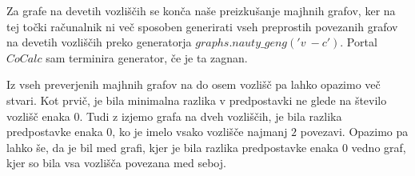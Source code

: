 \documentclass[10pt, a4paper]{article}
\begin{document}
Za grafe na devetih vozliščih se konča naše preizkušanje majhnih grafov, ker na tej točki računalnik ni več sposoben generirati vseh preprostih povezanih grafov na devetih vozliščih preko generatorja  $graphs.nauty\_geng('v\ -c')$. Portal $CoCalc$ sam terminira generator, če je ta zagnan.

Iz vseh preverjenih majhnih grafov na do osem vozlišč pa lahko opazimo več stvari. Kot prvič, je bila minimalna razlika v predpostavki ne glede na število vozlišč enaka $0$. Tudi z izjemo grafa na dveh vozliščih, je bila razlika predpostavke enaka $0$, ko je imelo vsako vozlišče najmanj $2$ povezavi. Opazimo pa lahko še, da je bil med grafi, kjer je bila razlika predpostavke enaka $0$ vedno graf, kjer so bila vsa vozlišča povezana med seboj.
\end{document}
